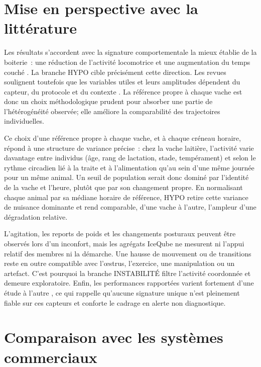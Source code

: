 \section{Mise en perspective avec la littérature}

Les résultats s'accordent avec la signature comportementale la mieux établie de la boiterie~:
une réduction de l'activité locomotrice et une augmentation du temps couché
\citep{ito2010lying,blackie2011lying,chapinal2010measurement}. La branche HYPO cible
précisément cette direction. Les revues soulignent toutefois que les variables utiles et
leurs amplitudes dépendent du capteur, du protocole et du contexte
\citep{oleary2020accelerometers,alsaaod2019automatic}. La référence propre à chaque vache est
donc un choix méthodologique prudent pour absorber une partie de l'hétérogénéité observée;
elle améliore la comparabilité des trajectoires individuelles.

Ce choix d'une référence propre à chaque vache, et à chaque créneau horaire, répond à une
structure de variance précise~: chez la vache laitière, l'activité varie davantage entre
individus (âge, rang de lactation, stade, tempérament) et selon le rythme circadien lié à la
traite et à l'alimentation qu'au sein d'une même journée pour un même animal. Un seuil de
population serait donc dominé par l'identité de la vache et l'heure, plutôt que par son
changement propre. En normalisant chaque animal par sa médiane horaire de référence, HYPO
retire cette variance de nuisance dominante et rend comparable, d'une vache à l'autre,
l'ampleur d'une dégradation relative.

L'agitation, les reports de poids et les changements posturaux peuvent être observés lors
d'un inconfort, mais les agrégats IceQube ne mesurent ni l'appui relatif des membres ni la
démarche. Une hausse de mouvement ou de transitions reste en outre compatible avec l'œstrus,
l'exercice, une manipulation ou un artefact. C'est pourquoi la branche INSTABILITÉ filtre
l'activité coordonnée et demeure exploratoire. Enfin, les performances rapportées varient
fortement d'une étude à l'autre
\citep{oleary2020accelerometers,qiao2021review}, ce qui rappelle qu'aucune signature unique
n'est pleinement fiable sur ces capteurs et conforte le cadrage en alerte non diagnostique.

\section{Comparaison avec les systèmes commerciaux}

